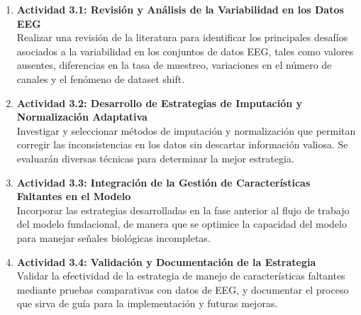 \begin{enumerate}
	\item \textbf{Actividad 3.1: Revisión y Análisis de la Variabilidad en los Datos EEG}\\
	Realizar una revisión de la literatura para identificar los principales desafíos asociados a la variabilidad en los conjuntos de datos EEG, tales como valores ausentes, diferencias en la tasa de muestreo, variaciones en el número de canales y el fenómeno de dataset shift.
	
	\item \textbf{Actividad 3.2: Desarrollo de Estrategias de Imputación y Normalización Adaptativa}\\
	Investigar y seleccionar métodos de imputación y normalización que permitan corregir las inconsistencias en los datos sin descartar información valiosa. Se evaluarán diversas técnicas para determinar la mejor estrategia.
	
	\item \textbf{Actividad 3.3: Integración de la Gestión de Características Faltantes en el Modelo}\\
	Incorporar las estrategias desarrolladas en la fase anterior al flujo de trabajo del modelo fundacional, de manera que se optimice la capacidad del modelo para manejar señales biológicas incompletas.
	
	\item \textbf{Actividad 3.4: Validación y Documentación de la Estrategia}\\
	Validar la efectividad de la estrategia de manejo de características faltantes mediante pruebas comparativas con datos de EEG, y documentar el proceso que sirva de guía para la implementación y futuras mejoras.
\end{enumerate}
